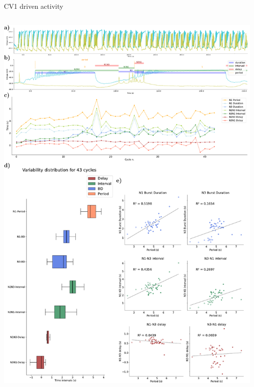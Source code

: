 \documentclass[aspectratio=43]{beamer}
\begin{document}
\begin{frame}{CV1 driven activity}
\begin{columns}
\begin{column}{0.5\textwidth}
		\includegraphics[width=\textwidth]{invariants/data/SUSSEX/CV1a_driven2/images/panel_with_intervals.pdf}
		\end{column}
	\end{columns}
\end{frame}
\end{document}
